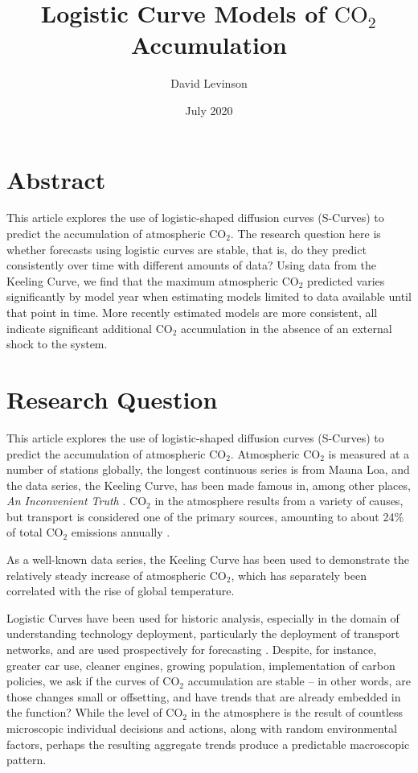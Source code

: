 \documentclass{article}
\title{Logistic Curve Models of $\mathrm{CO_{2}}$ Accumulation}
\author{David Levinson}
\date{July 2020}
\begin{document}
\maketitle

\section*{Abstract}

This article explores the use of logistic-shaped diffusion curves (S-Curves) to predict the accumulation of atmospheric $\mathrm{CO_{2}}$.  The research question here is whether forecasts using logistic curves are stable, that is, do they predict consistently over time with different amounts of data?  Using data from the Keeling Curve, we find that the maximum atmospheric $\mathrm{CO_{2}}$ predicted varies significantly by model year when estimating models limited to data available until that point in time. More recently estimated models are more consistent, all indicate  significant additional $\mathrm{CO_{2}}$ accumulation in the absence of an external shock to the system.

\section{Research Question}



This article explores the use of logistic-shaped diffusion curves (S-Curves) to predict the accumulation of atmospheric $\mathrm{CO_{2}}$. Atmospheric $\mathrm{CO_{2}}$ is measured at a number of stations globally, the longest continuous series is from Mauna Loa, and the data series, the Keeling Curve, \citep{keeling2001exchanges} has been made famous in, among other places, \textit{An Inconvenient Truth} \citep{gore2006inconvenient}. $\mathrm{CO_{2}}$ in the atmosphere results from a variety of causes, but transport is considered one of the primary sources, amounting to about 24\% of total $\mathrm{CO_{2}}$ emissions annually \citep{solaymani2019co2}.

As a well-known data series, the Keeling Curve has been used to demonstrate the relatively steady increase of atmospheric $\mathrm{CO_{2}}$, which has separately been correlated with the rise of global temperature.

Logistic Curves have been used for historic analysis, especially in the domain of understanding technology deployment, particularly the deployment of transport networks, and are used prospectively for forecasting \citep{detarde1903laws,rogers1995diffusion,marchetti1980society,batten1985industrial,nakicenovic1988dynamics,garrison1989using,grubler1990rise,garrison1996transportation,levinson2017end,dediu2018thenumber}. Despite, for instance, greater car use, cleaner engines, growing population, implementation of carbon policies,  we ask if the curves of $\mathrm{CO_{2}}$ accumulation are stable -- in other words,  are those changes small or offsetting, and have trends that are already embedded in the function? While the level of $\mathrm{CO_{2}}$ in the atmosphere is the result of countless microscopic individual decisions and actions, along with random environmental factors, perhaps the resulting aggregate trends produce a predictable macroscopic pattern.
\end{document}
